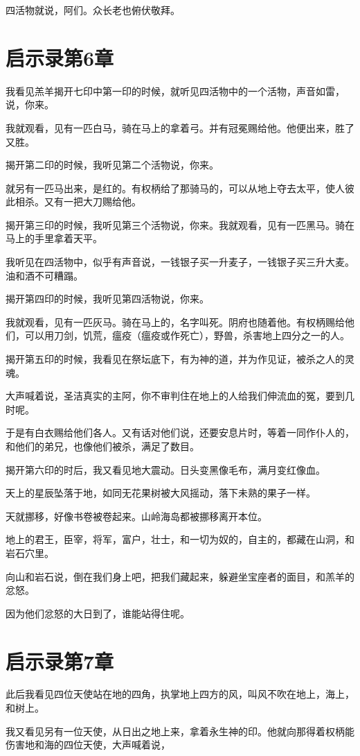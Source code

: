\documentclass[12pt,oneside]{book}
\begin{document}
四活物就说，阿们。众长老也俯伏敬拜。

\chapter{启示录第6章}
我看见羔羊揭开七印中第一印的时候，就听见四活物中的一个活物，声音如雷，说，你来。

我就观看，见有一匹白马，骑在马上的拿着弓。并有冠冕赐给他。他便出来，胜了又胜。

揭开第二印的时候，我听见第二个活物说，你来。

就另有一匹马出来，是红的。有权柄给了那骑马的，可以从地上夺去太平，使人彼此相杀。又有一把大刀赐给他。

揭开第三印的时候，我听见第三个活物说，你来。我就观看，见有一匹黑马。骑在马上的手里拿着天平。

我听见在四活物中，似乎有声音说，一钱银子买一升麦子，一钱银子买三升大麦。油和酒不可糟蹋。

揭开第四印的时候，我听见第四活物说，你来。

我就观看，见有一匹灰马。骑在马上的，名字叫死。阴府也随着他。有权柄赐给他们，可以用刀剑，饥荒，瘟疫（瘟疫或作死亡），野兽，杀害地上四分之一的人。

揭开第五印的时候，我看见在祭坛底下，有为神的道，并为作见证，被杀之人的灵魂。

大声喊着说，圣洁真实的主阿，你不审判住在地上的人给我们伸流血的冤，要到几时呢。

于是有白衣赐给他们各人。又有话对他们说，还要安息片时，等着一同作仆人的，和他们的弟兄，也像他们被杀，满足了数目。

揭开第六印的时后，我又看见地大震动。日头变黑像毛布，满月变红像血。

天上的星辰坠落于地，如同无花果树被大风摇动，落下未熟的果子一样。

天就挪移，好像书卷被卷起来。山岭海岛都被挪移离开本位。

地上的君王，臣宰，将军，富户，壮士，和一切为奴的，自主的，都藏在山洞，和岩石穴里。

向山和岩石说，倒在我们身上吧，把我们藏起来，躲避坐宝座者的面目，和羔羊的忿怒。

因为他们忿怒的大日到了，谁能站得住呢。

\chapter{启示录第7章}
此后我看见四位天使站在地的四角，执掌地上四方的风，叫风不吹在地上，海上，和树上。

我又看见另有一位天使，从日出之地上来，拿着永生神的印。他就向那得着权柄能伤害地和海的四位天使，大声喊着说，
\end{document}
